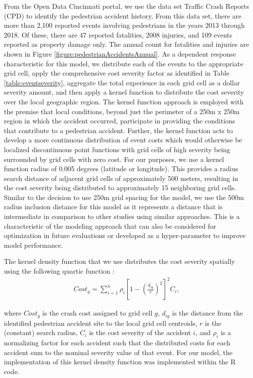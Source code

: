 \documentclass{llncs}
\begin{document}
From the Open Data Cincinnati portal, we use the data set Traffic Crash Reports (CPD) to identify the pedestrian accident history. From this data set, there are more than 2,100 reported events involving pedestrians in the years 2013 through 2018. Of these, there are 47 reported fatalities, 2008 injuries, and 109 events reported as property damage only. The annual count for fatalities and injuries are shown in Figure \ref{figure:pedestrianAccidentsAnnual}. As a dependent response characteristic for this model, we distribute each of the events to the appropriate grid cell, apply the comprehensive cost severity factor as identified in Table \ref{table:eventseverity}, aggregate the total experience in each grid cell as a dollar severity amount, and then apply a kernel function to distribute the cost severity over the local geographic region. The kernel function approach is employed with the premise that local conditions, beyond just the perimeter of a 250m x 250m region in which the accident occurred, participate in providing the conditions that contribute to a pedestrian accident. Further, the kernel function acts to develop a more continuous distribution of event costs which would otherwise be localized discontinuous point functions with grid cells of high severity being surrounded by grid cells with zero cost. For our purposes, we use a kernel function radius of 0.005 degrees (latitude or longitude). This provides a radius search distance of adjacent grid cells of approximately 500 meters, resulting in the cost severity being distributed to approximately 15 neighboring grid cells.  Similar to the decision to use 250m grid spacing for the model, we use the 500m radius inclusion distance for this model as it represents a distance that is intermediate in comparison to other studies using similar approaches. This is a characteristic of the modeling approach that can also be considered for optimization in future evaluations or developed as a hyper-parameter to improve model performance.

The kernel density function that we use distributes the cost severity spatially using the following quartic function\cite{xie2017analysis} : 
\begin{align}
Cost_{g} = \sum_{i=1}^{n} \rho_{i} \left [ 1 - \left ( \frac{d_{ig}}{r} \right )^{2} \right ]^{2}C_{i},
\end{align}

where $Cost_{g}$ is the crash cost assigned to grid cell $g$, $d_{ig}$    is the distance from the identified pedestrian accident site to the local grid cell centroids, $r$ is the (constant) search radius, $C_{i}$ is the cost severity of the accident ${i}$, and $\rho_{i}$ is a normalizing factor for each accident such that the distributed costs for each accident sum to the nominal severity value of that event. For our model, the implementation of this kernel density function was implemented within the R code.
\end{document}
